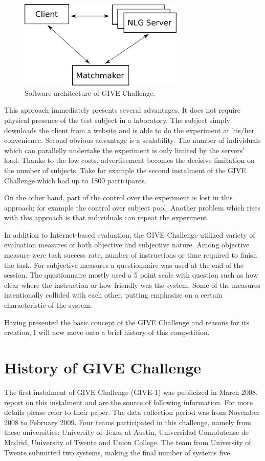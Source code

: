 \begin{figure}[!htbp]
  \centering
	\includegraphics[width=0.7\textwidth]{Images/give-client-servers}
	\caption{Software architecture of GIVE Challenge.}
	\label{fig:give-clientserver}
\end{figure}

This approach immediately presents several advantages. It does not require physical presence of the test subject in a laboratory. The subject simply downloads the client from a website and is able to do the experiment at his/her convenience. Second obvious advantage is a scalability. The number of individuals which can parallelly undertake the experiment is only limited by the servers' load. Thanks to the low costs, advertisement becomes the decisive limitation on the number of subjects. Take for example the second instalment of the GIVE Challenge which had up to 1800 participants.

On the other hand, part of the control over the experiment is lost in this approach; for example the control over subject pool. Another problem which rises with this approach is that individuals can repeat the experiment.

In addition to Internet-based evaluation, the GIVE Challenge utilized variety of evaluation measures of both objective and subjective nature. Among objective measure were task success rate, number of instructions or time required to finish the task. For subjective measures a questionnaire was used at the end of the session. The questionnaire mostly used a 5 point scale with question such as how clear where the instruction or how friendly was the system. Some of the measures intentionally collided with each other, putting emphasize on a certain characteristic of the system.

Having presented the basic concept of the GIVE Challenge and reasons for its creation, I will now move onto a brief history of this competition. 

 
\section{History of GIVE Challenge}
The first instalment of GIVE Challenge (GIVE-1) was publicized in March 2008. \citet{koller2010first} report on this instalment and are the source of following information. For more details please refer to their paper. The data collection period was from November 2008 to February 2009. Four teams participated in this challenge, namely from these universities: University of Texas at Austin, Universidad Complutense de Madrid, University of Twente and Union College. The team from University of Twente submitted two systems, making the final number of systems five.

